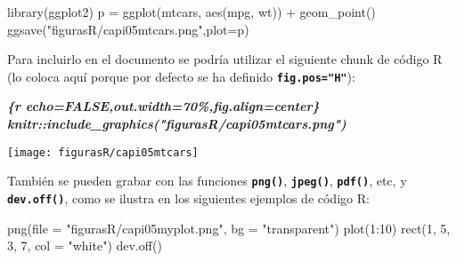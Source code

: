 \documentclass[12pt,a4paper,]{book}
\newenvironment{Shaded}{\begin{snugshade}}{\end{snugshade}}
\newcommand{\AttributeTok}[1]{\textcolor[rgb]{0.77,0.63,0.00}{#1}}
\newcommand{\DecValTok}[1]{\textcolor[rgb]{0.00,0.00,0.81}{#1}}
\newcommand{\FunctionTok}[1]{\textcolor[rgb]{0.00,0.00,0.00}{#1}}
\newcommand{\InformationTok}[1]{\textcolor[rgb]{0.56,0.35,0.01}{\textbf{\textit{#1}}}}
\newcommand{\NormalTok}[1]{#1}
\newcommand{\OtherTok}[1]{\textcolor[rgb]{0.56,0.35,0.01}{#1}}
\newcommand{\SpecialCharTok}[1]{\textcolor[rgb]{0.00,0.00,0.00}{#1}}
\newcommand{\StringTok}[1]{\textcolor[rgb]{0.31,0.60,0.02}{#1}}
\numberwithin{dummy}{section}
\theoremstyle{ocrenumbox}
\theoremstyle{blacknumex}
\theoremstyle{blacknumbox}
\theoremstyle{ocrenum}
\theoremstyle{ocrenum}
\begin{document}
\begin{Shaded}
\begin{Highlighting}[]
\FunctionTok{library}\NormalTok{(ggplot2)}
\NormalTok{p }\OtherTok{=} \FunctionTok{ggplot}\NormalTok{(mtcars, }\FunctionTok{aes}\NormalTok{(mpg, wt)) }\SpecialCharTok{+} 
  \FunctionTok{geom\_point}\NormalTok{()}
\FunctionTok{ggsave}\NormalTok{(}\StringTok{"figurasR/capi05mtcars.png"}\NormalTok{,}\AttributeTok{plot=}\NormalTok{p)}
\end{Highlighting}
\end{Shaded}

Para incluirlo en el documento se podría utilizar el siguiente chunk de
código R (lo coloca aquí porque por defecto se ha definido
\textbf{\texttt{fig.pos="H"}}):

\begin{Shaded}
\begin{Highlighting}[]
\InformationTok{\textasciigrave{}\textasciigrave{}\textasciigrave{}\{r echo=FALSE,out.width=\textquotesingle{}70\%\textquotesingle{},fig.align=\textquotesingle{}center\textquotesingle{}\}}
\InformationTok{knitr::include\_graphics("figurasR/capi05mtcars.png")}
\InformationTok{\textasciigrave{}\textasciigrave{}\textasciigrave{}}
\end{Highlighting}
\end{Shaded}

\begin{center}\texttt{[image: figurasR/capi05mtcars]} \end{center}

También se pueden grabar con las funciones \textbf{\texttt{png()}},
\textbf{\texttt{jpeg()}}, \textbf{\texttt{pdf()}}, etc, y
\textbf{\texttt{dev.off()}}, como se ilustra en los siguientes ejemplos
de código R:

\begin{Shaded}
\begin{Highlighting}[]
\FunctionTok{png}\NormalTok{(}\AttributeTok{file =} \StringTok{"figurasR/capi05myplot.png"}\NormalTok{, }\AttributeTok{bg =} \StringTok{"transparent"}\NormalTok{)}
\FunctionTok{plot}\NormalTok{(}\DecValTok{1}\SpecialCharTok{:}\DecValTok{10}\NormalTok{)}
\FunctionTok{rect}\NormalTok{(}\DecValTok{1}\NormalTok{, }\DecValTok{5}\NormalTok{, }\DecValTok{3}\NormalTok{, }\DecValTok{7}\NormalTok{, }\AttributeTok{col =} \StringTok{"white"}\NormalTok{)}
\FunctionTok{dev.off}\NormalTok{()}
\end{Highlighting}
\end{Shaded}
\end{document}
